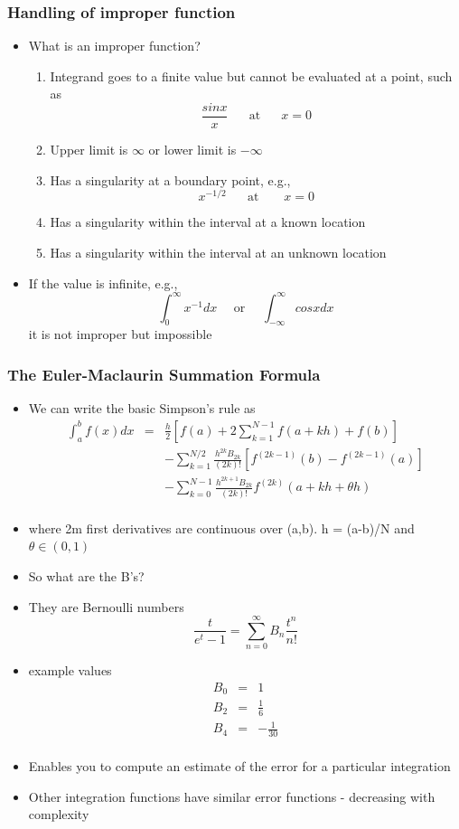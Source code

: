 \documentclass[10pt]{beamer}
\begin{document}
\begin{frame}
  \frametitle{Handling of improper function}
  \begin{itemize}
  \item What is an improper function?
    \pause
    \begin{enumerate}
    \item Integrand goes to a finite value but cannot be evaluated at a point, such as
      \[
        \frac{sin x}{x} \mbox{ ~~~ at ~~~ } x=0
      \]
    \item Upper limit is $\infty$ or lower limit is $-\infty$
    \item Has a singularity at a boundary point, e.g.,
      \[
        x^{-1/2} \mbox{~~~~ at ~~~~~} x = 0
      \]
    \item Has a singularity within the interval at a known location
    \item Has a singularity within the interval at an unknown location
    \end{enumerate}
  \item If the value is infinite, e.g.,
    \[
      \int_0^{\infty} x^{-1} dx \mbox{~~~~or~~~~} \int_{-\infty}^{\infty} cos x dx
    \] it is not improper but impossible
  \end{itemize}
\end{frame}

\begin{frame}
  \frametitle{The Euler-Maclaurin Summation Formula}
  \begin{itemize}
  \item We can write the basic Simpson's rule as
    \[
      \begin{array}{rcl}
      \int_a^b f(x) dx &=& \frac{h}{2} \left[ f(a) + 2 \sum_{k=1}^{N-1} f (a + kh) + f(b) \right]\\
                       && - \sum_{k=1}^{N/2} \frac{h^{2k} B_{2k}}{(2k)!}[ f^{(2k-1)}(b) - f^{(2k-1)}(a)] \\
                       && - \sum_{k=0}^{N-1} \frac{h^{2k+1} B_{2k}}{(2k)!} f^{(2k)}(a + kh + \theta h) \\
      \end{array}
    \]
  \item where 2m first derivatives are continuous over (a,b). h = (a-b)/N and $\theta\in(0,1)$
  \item So what are the B's?
  \item They are Bernoulli numbers
    \[
      \frac{t}{e^t-1} = \sum_{n=0}^{\infty} B_n \frac{t^n}{n!}
    \]
  \item example values
    \[
      \begin{array}{rcl}
        B_0 & = & 1\\
        B_2 & = & \frac{1}{6} \\
        B_4 & = & - \frac{1}{30}\\
      \end{array}
    \]
  \item Enables you to compute an estimate of the error for a particular integration
  \item Other integration functions have similar error functions - decreasing with complexity
  \end{itemize}
\end{frame}
\end{document}
